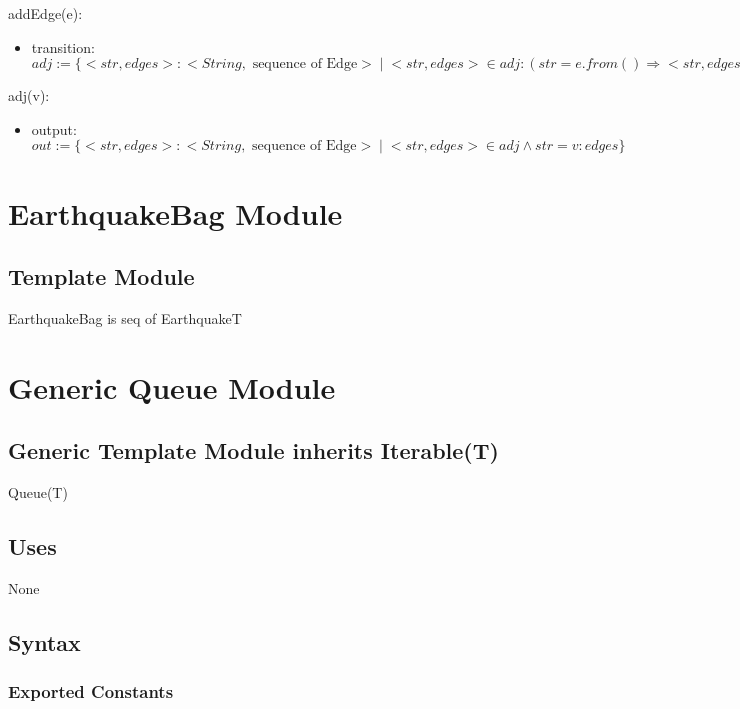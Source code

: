 \documentclass[12pt]{article}
\begin{document}
\noindent addEdge(e):
\begin{itemize}
\item transition: $adj := \{<str, edges>: <String, \mbox{ sequence of Edge}> \;|\; <str, edges> \in adj : (str = e.from() \Rightarrow <str, edges || [e]> \;|\; true \Rightarrow <str, edges>)\}$ 

\end{itemize}

\noindent adj(v):
\begin{itemize}
\item output: $\mathit{out} := \{<str, edges>: <String, \mbox{ sequence of Edge}> \;|\; <str, edges> \in adj \land str = v: edges\}$
\end{itemize}


\newpage

\section* {EarthquakeBag Module}

\subsection*{Template Module}

EarthquakeBag is seq of EarthquakeT



\newpage

\section* {Generic Queue Module}

\subsection*{Generic Template Module inherits Iterable(T)}

Queue(T)

\subsection* {Uses}

None

\subsection* {Syntax}

\subsubsection* {Exported Constants}
\end{document}
